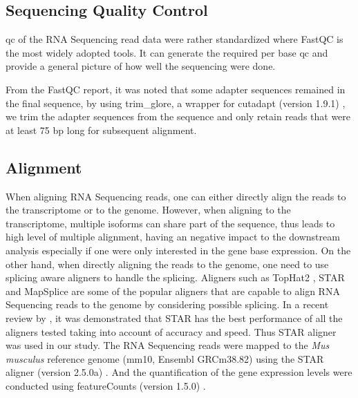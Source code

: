 \subsection{Sequencing Quality Control}
\Gls{qc} of the RNA Sequencing read data were rather standardized where FastQC \citep{Andrews2010} is the most widely adopted tools.
It can generate the required per base \gls{qc} and provide a general picture of how well the sequencing were done.

From the FastQC report, it was noted that some adapter sequences remained in the final sequence, by using trim\_glore, a wrapper for cutadapt (version 1.9.1) \citep{Martin2011}, we trim the adapter sequences from the sequence and only retain reads that were at least 75 \gls{bp} long for subsequent alignment. 

\subsection{Alignment}
When aligning RNA Sequencing reads, one can either directly align the reads to the transcriptome or to the genome. 
However, when aligning to the transcriptome, multiple isoforms can share part of the sequence, thus leads to high level of multiple alignment, having an negative impact to the downstream analysis especially if one were only interested in the gene base expression.
On the other hand, when directly aligning the reads to the genome, one need to use splicing aware aligners to handle the splicing.
Aligners such as TopHat2 \citep{Kim2013}, STAR \citep{Dobin2013} and MapSplice \citep{Wang2010} are some of the popular aligners that are capable to align RNA Sequencing reads to the genome by considering possible splicing.
In a recent review by \citet{Engstrom2013}, it was demonstrated that STAR has the best performance of all the aligners tested taking into account of accuracy and speed.
Thus STAR aligner was used in our study.
The RNA Sequencing reads were mapped to the \textit{Mus musculus} reference genome (mm10, Ensembl GRCm38.82) using the STAR aligner (version 2.5.0a) \citep{Dobin2013}.
And the quantification of the gene expression levels were conducted using featureCounts (version 1.5.0) \citep{Liao2014}.

